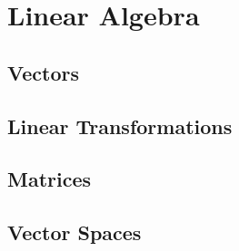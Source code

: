 \chapter{Linear Algebra}

\section{Vectors}







%
%
%
%

\section{Linear Transformations}



\section{Matrices}




\section{Vector Spaces}



















